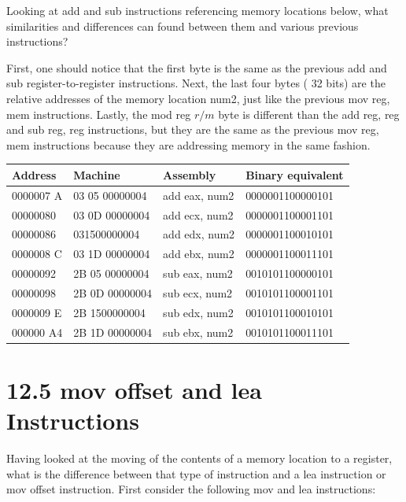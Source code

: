 \documentclass[10pt]{book}
\begin{document}
\begin{center}
\begin{center}
\begin{center}
\begin{center}
\begin{center}
Looking at add and sub instructions referencing memory locations below, what similarities and differences can found between them and various previous instructions?

First, one should notice that the first byte is the same as the previous add and sub register-to-register instructions. Next, the last four bytes ( 32 bits) are the relative addresses of the memory location num2, just like the previous mov reg, mem instructions. Lastly, the mod reg $r / m$ byte is different than the add reg, reg and sub reg, reg instructions, but they are the same as the previous mov reg, mem instructions because they are addressing memory in the same fashion.

\begin{center}
\begin{tabular}{|l|l|l|l|}
\hline
Address & Machine & Assembly & Binary equivalent \\
\hline
0000007 A & 03 05 00000004 & add eax, num2 & 0000001100000101 \\
\hline
00000080 & 03 0D 00000004 & add ecx, num2 & 0000001100001101 \\
\hline
00000086 & 031500000004 & add edx, num2 & 0000001100010101 \\
\hline
0000008 C & 03 1D 00000004 & add ebx, num2 & 0000001100011101 \\
\hline
00000092 & 2B 05 00000004 & sub eax, num2 & 0010101100000101 \\
\hline
00000098 & 2B 0D 00000004 & sub ecx, num2 & 0010101100001101 \\
\hline
0000009 E & 2B 1500000004 & sub edx, num2 & 0010101100010101 \\
\hline
000000 A4 & 2B 1D 00000004 & sub ebx, num2 & 0010101100011101 \\
\hline
\end{tabular}
\end{center}

\section*{12.5 mov offset and lea Instructions}
Having looked at the moving of the contents of a memory location to a register, what is the difference between that type of instruction and a lea instruction or mov offset instruction. First consider the following mov and lea instructions:


\end{center}
\end{center}
\end{center}
\end{center}
\end{center}
\end{document}

